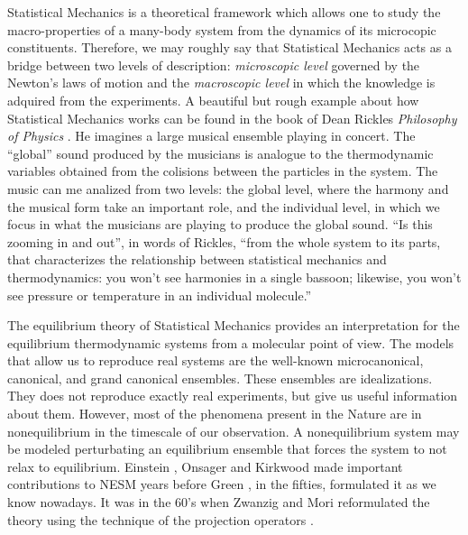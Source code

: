 \documentclass[b5paper,openright,10pt]{book}
\begin{document}
Statistical Mechanics is a theoretical framework which allows one to study the macro-properties of a many-body system from the dynamics of its microcopic constituents.
Therefore, we may roughly say that Statistical Mechanics acts as a bridge between two levels of description: {\it microscopic level} governed by the Newton's laws of motion and the {\it macroscopic level} in which the knowledge is adquired from the experiments.
A beautiful but rough example about how Statistical Mechanics works can be found in the book of Dean Rickles {\it Philosophy of Physics} \cite{Rickles2016}.
He imagines a large musical ensemble playing in concert.
The ``global'' sound produced by the musicians is analogue to the thermodynamic variables obtained from the colisions between the particles in the system. 
The music can me analized from two levels: the global level, where the harmony and the musical form take an important role, and the individual level, in which we focus in what the musicians are playing to produce the global sound. ``Is this zooming in and out'', in words of Rickles, ``from the whole system to its parts, that characterizes the relationship between statistical mechanics and thermodynamics: you won't see harmonies in a single bassoon; likewise, you won't see pressure or temperature in an individual molecule.''

The equilibrium theory of Statistical Mechanics provides an interpretation for the equilibrium thermodynamic systems from a molecular point of view. The models that allow us to reproduce real systems are the well-known microcanonical, canonical, and grand canonical ensembles. These ensembles are idealizations. They does not reproduce exactly real experiments, but give us useful information about them. 
However, most of the phenomena present in the Nature are in nonequilibrium in the timescale of our observation. A nonequilibrium system may be modeled perturbating an equilibrium ensemble that forces the system to not relax to equilibrium.  
Einstein \cite{Einstein1905}, Onsager \cite{Onsager1931} and Kirkwood \cite{Kirkwood1946} made important contributions to NESM years before Green \cite{Green1952, Green1954}, in the fifties, formulated it as we know nowadays. 
It was in the 60's when Zwanzig \cite{Zwanzig1961} and Mori \cite{Mori1965} reformulated the theory using the technique of the projection operators \cite{Grabert1982}. 
\end{document}
